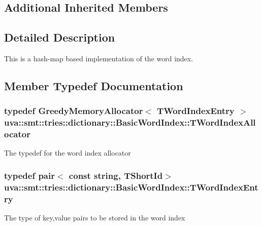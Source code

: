 \subsection*{Additional Inherited Members}


\subsection{Detailed Description}
This is a hash-\/map based implementation of the word index. 

\subsection{Member Typedef Documentation}
\hypertarget{classuva_1_1smt_1_1tries_1_1dictionary_1_1_basic_word_index_a8905f9a7cdaf1c7295043be33de20749}{}
\subsubsection[{T\+Word\+Index\+Allocator}]{\setlength{\rightskip}{0pt plus 5cm}typedef {\bf Greedy\+Memory\+Allocator}$<$ {\bf T\+Word\+Index\+Entry} $>$ {\bf uva\+::smt\+::tries\+::dictionary\+::\+Basic\+Word\+Index\+::\+T\+Word\+Index\+Allocator}}\label{classuva_1_1smt_1_1tries_1_1dictionary_1_1_basic_word_index_a8905f9a7cdaf1c7295043be33de20749}
The typedef for the word index allocator \hypertarget{classuva_1_1smt_1_1tries_1_1dictionary_1_1_basic_word_index_af822e72a0e94a0e96e83ee9bf16d50e2}{}
\subsubsection[{T\+Word\+Index\+Entry}]{\setlength{\rightskip}{0pt plus 5cm}typedef pair$<$ const string, {\bf T\+Short\+Id}$>$ {\bf uva\+::smt\+::tries\+::dictionary\+::\+Basic\+Word\+Index\+::\+T\+Word\+Index\+Entry}}\label{classuva_1_1smt_1_1tries_1_1dictionary_1_1_basic_word_index_af822e72a0e94a0e96e83ee9bf16d50e2}
The type of key,value pairs to be stored in the word index \hypertarget{classuva_1_1smt_1_1tries_1_1dictionary_1_1_basic_word_index_ab9afbbd6dda7d8579f804508ac094574}{}
